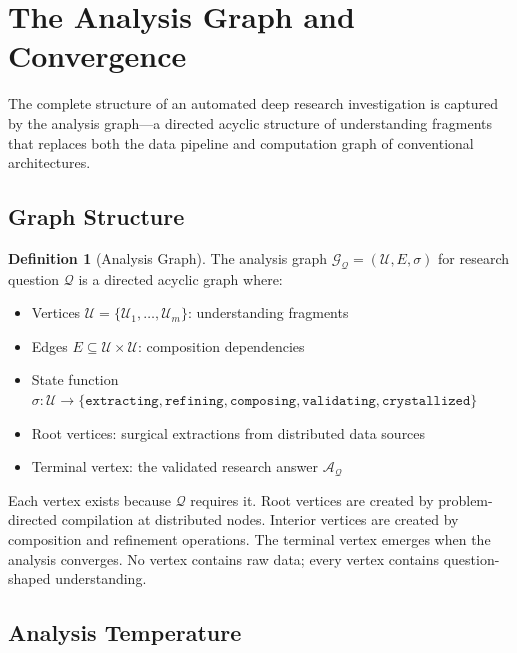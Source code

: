 \documentclass[10pt,twocolumn]{article}
\theoremstyle{definition}
\newtheorem{definition}[theorem]{Definition}
\theoremstyle{remark}
\newcommand{\question}{\mathcal{Q}}
\newcommand{\answer}{\mathcal{A}}
\newcommand{\understanding}{\mathcal{U}}
\newcommand{\graph}{\mathcal{G}}
\begin{document}
\section{The Analysis Graph and Convergence}
\label{sec:analysis_graph}

The complete structure of an automated deep research investigation is captured by the analysis graph---a directed acyclic structure of understanding fragments that replaces both the data pipeline and computation graph of conventional architectures.

\subsection{Graph Structure}

\begin{definition}[Analysis Graph]
The analysis graph $\graph_\question = (\understanding, E, \sigma)$ for research question $\question$ is a directed acyclic graph where:
\begin{itemize}[nosep]
\item Vertices $\understanding = \{\understanding_1, \ldots, \understanding_m\}$: understanding fragments
\item Edges $E \subseteq \understanding \times \understanding$: composition dependencies
\item State function $\sigma : \understanding \to \{\texttt{extracting}, \texttt{refining}, \texttt{composing}, \texttt{validating}, \texttt{crystallized}\}$
\item Root vertices: surgical extractions from distributed data sources
\item Terminal vertex: the validated research answer $\answer_\question$
\end{itemize}
\end{definition}

Each vertex exists because $\question$ requires it. Root vertices are created by problem-directed compilation at distributed nodes. Interior vertices are created by composition and refinement operations. The terminal vertex emerges when the analysis converges. No vertex contains raw data; every vertex contains question-shaped understanding.

\subsection{Analysis Temperature}
\end{document}
